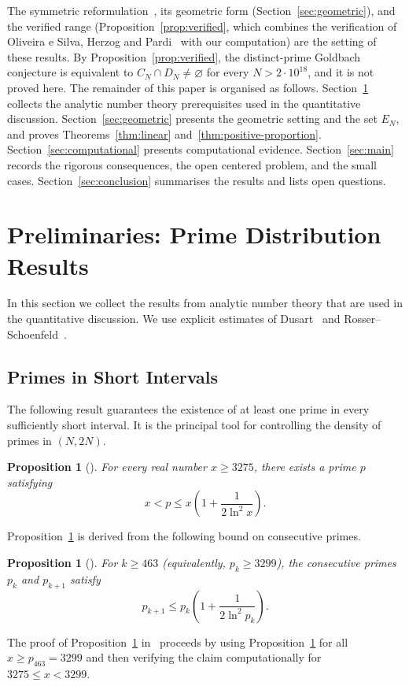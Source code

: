 \documentclass[11pt]{amsart}
\newtheorem{Proposition}[Theorem]{Proposition}
\theoremstyle{definition}
\theoremstyle{remark}
\begin{document}
The symmetric reformulation~\cite{oeisA082467}, its geometric form (Section~\ref{sec:geometric}), and the verified range (Proposition~\ref{prop:verified}, which combines the verification of Oliveira e Silva, Herzog and Pardi~\cite{oliveira2014empirical} with our computation) are the setting of these results. By Proposition~\ref{prop:verified}, the distinct-prime Goldbach conjecture is equivalent to $C_N\cap D_N\neq\varnothing$ for every $N>2\cdot 10^{18}$, and it is not proved here.
The remainder of this paper is organised as follows. Section~\ref{sec:prelim} collects the analytic number theory prerequisites used in the quantitative discussion. Section~\ref{sec:geometric} presents the geometric setting and the set $E_N$, and proves Theorems~\ref{thm:linear} and~\ref{thm:positive-proportion}. Section~\ref{sec:computational} presents computational evidence. Section~\ref{sec:main} records the rigorous consequences, the open centered problem, and the small cases. Section~\ref{sec:conclusion} summarises the results and lists open questions.
\section{Preliminaries: Prime Distribution Results}\label{sec:prelim}
In this section we collect the results from analytic number theory that are used in the quantitative discussion. We use explicit estimates of Dusart~\cite{dusart1998autour} and Rosser--Schoenfeld~\cite{rosser1962approximate}.
\subsection{Primes in Short Intervals}
The following result guarantees the existence of at least one prime in every sufficiently short interval. It is the principal tool for controlling the density of primes in $(N,2N)$.
\begin{Proposition}[{\cite[Th\'eor\`eme~1.9, p.\,35]{dusart1998autour}}]
\label{prop:dusart-short}
For every real number $x \geq 3275$, there exists a prime $p$ satisfying
\[
x < p \leq x\!\left(1 + \frac{1}{2\ln^2 x}\right).
\]
\end{Proposition}
Proposition~\ref{prop:dusart-short} is derived from the following bound on consecutive primes.
\begin{Proposition}[{\cite[Proposition~1.10, p.\,34]{dusart1998autour}}]
\label{prop:dusart-consec}
For $k \geq 463$ (equivalently, $p_k \geq 3299$), the consecutive primes $p_k$ and $p_{k+1}$ satisfy
\[
p_{k+1} \leq p_k\!\left(1 + \frac{1}{2\ln^2 p_k}\right).
\]
\end{Proposition}
The proof of Proposition~\ref{prop:dusart-short} in~\cite{dusart1998autour} proceeds by using Proposition~\ref{prop:dusart-consec} for all $x \geq p_{463} = 3299$ and then verifying the claim computationally for $3275 \leq x < 3299$.
\end{document}
